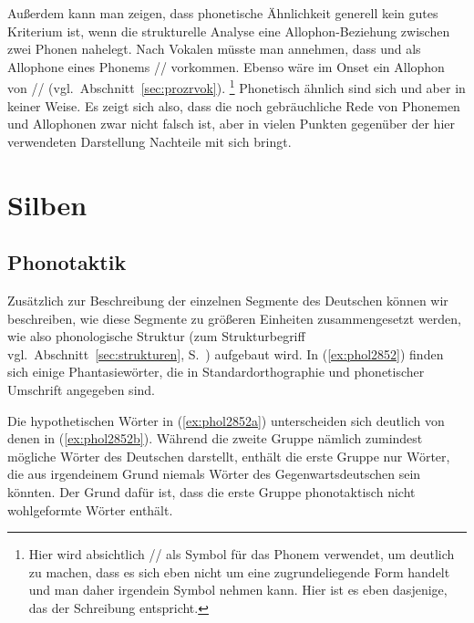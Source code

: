 Außerdem kann man zeigen, dass phonetische Ähnlichkeit generell kein gutes Kriterium ist, wenn die strukturelle Analyse eine Allophon-Beziehung zwischen zwei Phonen nahelegt.
Nach Vokalen müsste man \zB annehmen, dass \textipa{[@]} und \textipa{[5]} als Allophone eines Phonems // vorkommen.
Ebenso wäre im Onset \textipa{[K]} ein Allophon von // (vgl.\ Abschnitt~\ref{sec:prozrvok}).%
\footnote{Hier wird absichtlich // als Symbol für das Phonem verwendet, um deutlich zu machen, dass es sich eben nicht um eine zugrundeliegende Form handelt und man daher irgendein Symbol nehmen kann.
Hier ist es eben dasjenige, das der Schreibung entspricht.}
Phonetisch ähnlich sind sich \textipa{[@]} und \textipa{[K]} aber in keiner Weise.
Es zeigt sich also, dass die noch gebräuchliche Rede von Phonemen und Allophonen zwar nicht falsch ist, aber in vielen Punkten gegenüber der hier verwendeten Darstellung Nachteile mit sich bringt.

\section{Silben}

\label{sec:phonotaktik}

\subsection{Phonotaktik}

Zusätzlich zur Beschreibung der einzelnen Segmente des Deutschen können wir beschreiben, wie diese Segmente zu größeren Einheiten zusammengesetzt werden, wie also phonologische Struktur (zum Strukturbegriff vgl.\ Abschnitt~\ref{sec:strukturen}, S.~\pageref{sec:strukturen}) aufgebaut wird.
In (\ref{ex:phol2852}) finden sich einige Phantasiewörter, die in Standardorthographie und phonetischer Umschrift angegeben sind.

\begin{exe}
  \ex\label{ex:phol2852}
  \begin{xlist}
  \end{xlist}
\end{exe}

Die hypothetischen Wörter in (\ref{ex:phol2852a}) unterscheiden sich deutlich von denen in (\ref{ex:phol2852b}).
Während die zweite Gruppe nämlich zumindest mögliche Wörter des Deutschen darstellt, enthält die erste Gruppe nur Wörter, die aus irgendeinem Grund niemals Wörter des Gegenwartsdeutschen sein könnten.
Der Grund dafür ist, dass die erste Gruppe phonotaktisch nicht wohlgeformte Wörter enthält.

